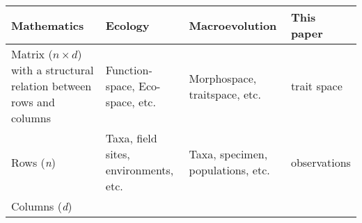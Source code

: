 \documentclass[]{article}
\begin{document}
\begin{longtable}[]{@{}llll@{}}
\toprule
\begin{minipage}[b]{0.24\columnwidth}\raggedright\strut
Mathematics\strut
\end{minipage} & \begin{minipage}[b]{0.24\columnwidth}\raggedright\strut
Ecology\strut
\end{minipage} & \begin{minipage}[b]{0.24\columnwidth}\raggedright\strut
Macroevolution\strut
\end{minipage} & \begin{minipage}[b]{0.15\columnwidth}\raggedright\strut
This paper\strut
\end{minipage}\tabularnewline
\midrule
\endhead
\begin{minipage}[t]{0.24\columnwidth}\raggedright\strut
Matrix (\(n \times d\)) with a structural relation between rows and
columns\strut
\end{minipage} & \begin{minipage}[t]{0.24\columnwidth}\raggedright\strut
Function-space, Eco-space, etc.\strut
\end{minipage} & \begin{minipage}[t]{0.24\columnwidth}\raggedright\strut
Morphospace, traitspace, etc.\strut
\end{minipage} & \begin{minipage}[t]{0.15\columnwidth}\raggedright\strut
trait space\strut
\end{minipage}\tabularnewline
\begin{minipage}[t]{0.24\columnwidth}\raggedright\strut
Rows (\emph{n})\strut
\end{minipage} & \begin{minipage}[t]{0.24\columnwidth}\raggedright\strut
Taxa, field sites, environments, etc.\strut
\end{minipage} & \begin{minipage}[t]{0.24\columnwidth}\raggedright\strut
Taxa, specimen, populations, etc.\strut
\end{minipage} & \begin{minipage}[t]{0.15\columnwidth}\raggedright\strut
observations\strut
\end{minipage}\tabularnewline
\begin{minipage}[t]{0.24\columnwidth}\raggedright\strut
Columns (\emph{d})\strut
\end{minipage} & \begin{minipage}[t]{0.24\columnwidth}\raggedright\strut

\end{minipage}
\end{longtable}
\end{document}
